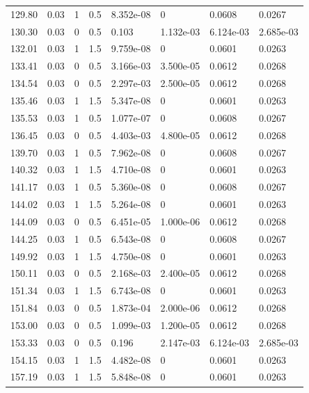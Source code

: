 \documentclass[preview]{standalone}
\begin{document}
{{{\begin{tabular}{L{1.2cm}C{1.2cm} C{0.3cm}C{0.5cm} C{1.4cm}C{1.4cm} C{1.4cm}C{1.4cm}}
  129.80  &  0.03  & 1     & 0.5 &  8.352e-08  & 0  & 0.0608 &  0.0267   \\ 
  130.30  &  0.03  & 0     & 0.5 &  0.103  & 1.132e-03  & 6.124e-03 &  2.685e-03   \\ 
  132.01  &  0.03  & 1     & 1.5 &  9.759e-08  & 0  & 0.0601 &  0.0263   \\ 
  133.41  &  0.03  & 0     & 0.5 &  3.166e-03  & 3.500e-05  & 0.0612 &  0.0268   \\ 
  134.54  &  0.03  & 0     & 0.5 &  2.297e-03  & 2.500e-05  & 0.0612 &  0.0268   \\ 
  135.46  &  0.03  & 1     & 1.5 &  5.347e-08  & 0  & 0.0601 &  0.0263   \\ 
  135.53  &  0.03  & 1     & 0.5 &  1.077e-07  & 0  & 0.0608 &  0.0267   \\ 
  136.45  &  0.03  & 0     & 0.5 &  4.403e-03  & 4.800e-05  & 0.0612 &  0.0268   \\ 
  139.70  &  0.03  & 1     & 0.5 &  7.962e-08  & 0  & 0.0608 &  0.0267   \\ 
  140.32  &  0.03  & 1     & 1.5 &  4.710e-08  & 0  & 0.0601 &  0.0263   \\ 
  141.17  &  0.03  & 1     & 0.5 &  5.360e-08  & 0  & 0.0608 &  0.0267   \\ 
  144.02  &  0.03  & 1     & 1.5 &  5.264e-08  & 0  & 0.0601 &  0.0263   \\ 
  144.09  &  0.03  & 0     & 0.5 &  6.451e-05  & 1.000e-06  & 0.0612 &  0.0268   \\ 
  144.25  &  0.03  & 1     & 0.5 &  6.543e-08  & 0  & 0.0608 &  0.0267   \\ 
  149.92  &  0.03  & 1     & 1.5 &  4.750e-08  & 0  & 0.0601 &  0.0263   \\ 
  150.11  &  0.03  & 0     & 0.5 &  2.168e-03  & 2.400e-05  & 0.0612 &  0.0268   \\ 
  151.34  &  0.03  & 1     & 1.5 &  6.743e-08  & 0  & 0.0601 &  0.0263   \\ 
  151.84  &  0.03  & 0     & 0.5 &  1.873e-04  & 2.000e-06  & 0.0612 &  0.0268   \\ 
  153.00  &  0.03  & 0     & 0.5 &  1.099e-03  & 1.200e-05  & 0.0612 &  0.0268   \\ 
  153.33  &  0.03  & 0     & 0.5 &  0.196  & 2.147e-03  & 6.124e-03 &  2.685e-03   \\ 
  154.15  &  0.03  & 1     & 1.5 &  4.482e-08  & 0  & 0.0601 &  0.0263   \\ 
  157.19  &  0.03  & 1     & 1.5 &  5.848e-08  & 0  & 0.0601 &  0.0263   \\ 

\end{tabular}}}}
\end{document}
